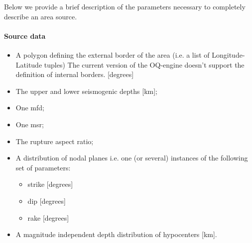Below we provide a brief description of the parameters necessary to 
completely describe an area source.
%
\paragraph{Source data}
\begin{itemize}
\item A polygon defining the external border of the area (i.e. a list of 
Longitude-Latitude tuples) The current version of the OQ-engine doesn't 
support the definition of internal borders.  [degrees]
\item The upper and lower seismogenic depths [km];
\item One \gls{mfd};
\item One \gls{msr};
\item The rupture aspect ratio;
\item A distribution of nodal planes i.e. one (or several) instances 
    of the following set of parameters:
\begin{itemize}
    \item \gls{strike} [degrees]
    \item \gls{dip} [degrees]
    \item \gls{rake} [degrees]
\end{itemize}
\item A magnitude independent depth distribution of hypocenters [km].
\end{itemize}

